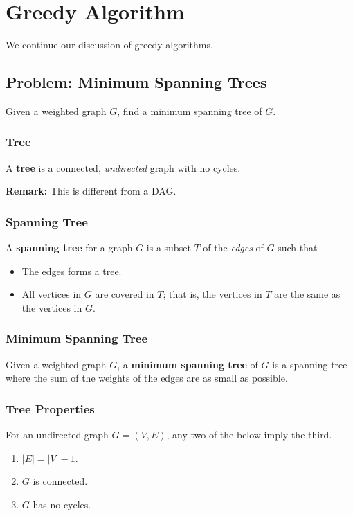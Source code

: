 \documentclass[letterpaper]{article}
\begin{document}
\section{Greedy Algorithm}
We continue our discussion of greedy algorithms.

\subsection{Problem: Minimum Spanning Trees}
Given a weighted graph $G$, find a minimum spanning tree of $G$. 

\subsubsection{Tree}
\begin{definition}{}{}
    A \textbf{tree} is a connected, \emph{undirected} graph with no cycles. 
\end{definition}
\textbf{Remark:} This is different from a DAG. 

\subsubsection{Spanning Tree}
\begin{definition}{}{}
    A \textbf{spanning tree} for a graph $G$ is a subset $T$ of the \emph{edges} of $G$ such that
    \begin{itemize}
        \item The edges forms a tree. 
        \item All vertices in $G$ are covered in $T$; that is, the vertices in $T$ are the same as the vertices in $G$. 
    \end{itemize}
\end{definition}

\subsubsection{Minimum Spanning Tree}
\begin{definition}{}{}
    Given a weighted graph $G$, a \textbf{minimum spanning tree} of $G$ is a spanning tree where the sum of the weights of the edges are as small as possible. 
\end{definition}

\subsubsection{Tree Properties}
\begin{lemma}{}{}
    For an undirected graph $G = (V, E)$, any two of the below imply the third. 
    \begin{enumerate}
        \item $|E| = |V| - 1$. 
        \item $G$ is connected. 
        \item $G$ has no cycles. 
    \end{enumerate}
\end{lemma}
\end{document}
